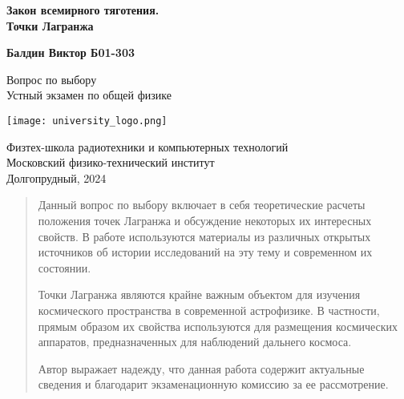 \documentclass[12pt]{article}
\begin{document}
    \begin{titlepage}
        \begin{center}
            \vspace*{1cm}

            \Huge
            \textbf{Закон всемирного тяготения.\\Точки Лагранжа}

            \vspace{1.5cm}

            \Large
            \textbf{Балдин Виктор Б01-303}

            \vfill

            Вопрос по выбору \\
            Устный экзамен по общей физике

            \vspace{0.8cm}

            \texttt{[image: university\_logo.png]}

            Физтех-школа радиотехники и компьютерных технологий\\
            Московский физико-технический институт\\
            Долгопрудный, 2024
        \end{center}
    \end{titlepage}

    \begin{abstract}
        \par Данный вопрос по выбору включает в себя теоретические расчеты
        положения точек Лагранжа и обсуждение некоторых их интересных
        свойств. В работе используются материалы из различных открытых
        источников об истории исследований на эту тему и современном их
        состоянии.
        \par Точки Лагранжа являются крайне важным объектом для изучения
        космического пространства в современной астрофизике.
        В частности, прямым образом их свойства используются для размещения
        космических аппаратов, предназначенных для наблюдений дальнего
        космоса.
        \par Автор выражает надежду, что данная работа содержит
        актуальные сведения и благодарит экзаменационную комиссию за ее
        рассмотрение.
    \end{abstract}

    \newpage
\end{document}
